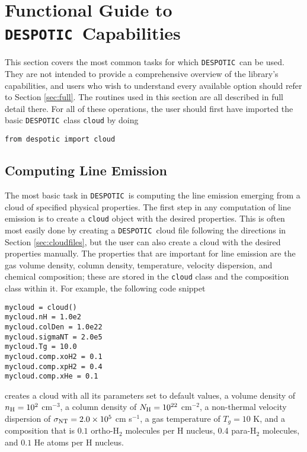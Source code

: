 \documentclass[12pt]{article}
\newcommand{\despotic}{\texttt{DESPOTIC}}
\begin{document}
\clearpage

\section{Functional Guide to \despotic\ Capabilities}

This section covers the most common tasks for which \despotic\ can be used. They are not intended to provide a comprehensive overview of the library's capabilities, and users who wish to understand every available option should refer to Section \ref{sec:full}. The routines used in this section are all described in full detail there. For all of these operations, the user should first have imported the basic \despotic\ class \verb=cloud= by doing
\begin{verbatim}
from despotic import cloud
\end{verbatim}


\subsection{Computing Line Emission}

The most basic task in \despotic\ is computing the line emission emerging from a cloud of specified physical properties. The first step in any computation of line emission is to create a \verb=cloud= object with the desired properties. This is often most easily done by creating a \despotic\ cloud file following the directions in Section \ref{sec:cloudfiles}, but the user can also create a cloud with the desired properties manually. The properties that are important for line emission are the gas volume density, column density, temperature, velocity dispersion, and chemical composition; these are stored in the \verb=cloud= class and the composition class within it. For example, the following code snippet
\begin{verbatim}
mycloud = cloud()
mycloud.nH = 1.0e2
mycloud.colDen = 1.0e22
mycloud.sigmaNT = 2.0e5
mycloud.Tg = 10.0
mycloud.comp.xoH2 = 0.1
mycloud.comp.xpH2 = 0.4
mycloud.comp.xHe = 0.1
\end{verbatim}
creates a cloud with all its parameters set to default values, a volume density of $n_{\rm H} = 10^2$ cm$^{-3}$, a column density of $N_{\rm H} = 10^{22}$ cm$^{-2}$, a non-thermal velocity dispersion of $\sigma_{\rm NT} = 2.0\times 10^5$ cm s$^{-1}$, a gas temperature of $T_g = 10$ K, and a composition that is $0.1$ ortho-H$_2$ molecules per H nucleus, 0.4 para-H$_2$ molecules, and $0.1$ He atoms per H nucleus.
\end{document}
